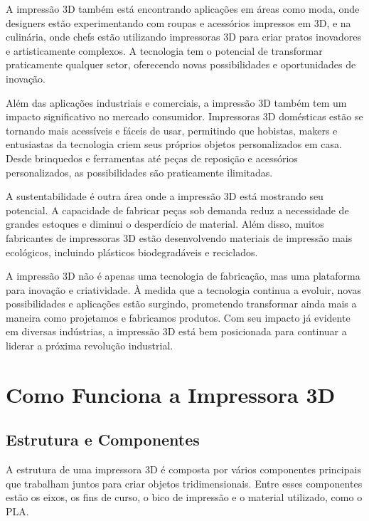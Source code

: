 \documentclass[
]{book}
\begin{document}
A impressão 3D também está encontrando aplicações em áreas como moda, onde designers estão experimentando com roupas e acessórios impressos em 3D, e na culinária, onde chefs estão utilizando impressoras 3D para criar pratos inovadores e artisticamente complexos. A tecnologia tem o potencial de transformar praticamente qualquer setor, oferecendo novas possibilidades e oportunidades de inovação.

Além das aplicações industriais e comerciais, a impressão 3D também tem um impacto significativo no mercado consumidor. Impressoras 3D domésticas estão se tornando mais acessíveis e fáceis de usar, permitindo que hobistas, makers e entusiastas da tecnologia criem seus próprios objetos personalizados em casa. Desde brinquedos e ferramentas até peças de reposição e acessórios personalizados, as possibilidades são praticamente ilimitadas.

A sustentabilidade é outra área onde a impressão 3D está mostrando seu potencial. A capacidade de fabricar peças sob demanda reduz a necessidade de grandes estoques e diminui o desperdício de material. Além disso, muitos fabricantes de impressoras 3D estão desenvolvendo materiais de impressão mais ecológicos, incluindo plásticos biodegradáveis e reciclados.

A impressão 3D não é apenas uma tecnologia de fabricação, mas uma plataforma para inovação e criatividade. À medida que a tecnologia continua a evoluir, novas possibilidades e aplicações estão surgindo, prometendo transformar ainda mais a maneira como projetamos e fabricamos produtos. Com seu impacto já evidente em diversas indústrias, a impressão 3D está bem posicionada para continuar a liderar a próxima revolução industrial.

\section{Como Funciona a Impressora 3D}\label{como-funciona-a-impressora-3d}

\subsection{Estrutura e Componentes}\label{estrutura-e-componentes}

A estrutura de uma impressora 3D é composta por vários componentes principais que trabalham juntos para criar objetos tridimensionais. Entre esses componentes estão os eixos, os fins de curso, o bico de impressão e o material utilizado, como o PLA.
\end{document}
